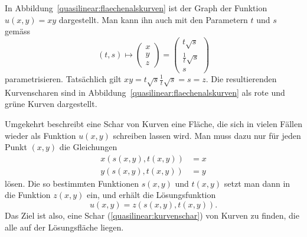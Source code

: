 In Abbildung~\ref{quasilinear:flaechenalskurven} ist der Graph der
Funktion $u(x,y)=xy$ dargestellt.
Man kann ihn auch mit den Parametern $t$ und $s$ gemäss
\begin{equation}
(t,s)
\mapsto
\begin{pmatrix}x\\y\\z\end{pmatrix}
=
\begin{pmatrix}t\sqrt{s}\\\frac1t\sqrt{s}\\s\end{pmatrix}
\label{quasliniear:flaechebeispiel}
\end{equation}
parametrisieren.
Tatsächlich gilt $xy = t\sqrt{s}\frac1t\sqrt{s}=s=z$.
Die resultierenden Kurvenscharen sind in
Abbildung~\ref{quasilinear:flaechenalskurven} als rote und grüne Kurven
dargestellt.

Umgekehrt beschreibt eine Schar von Kurven eine Fläche, die sich
in vielen Fällen wieder als Funktion $u(x,y)$ schreiben lassen wird.
Man muss dazu nur für jeden Punkt $(x,y)$ die Gleichungen
\begin{align*}
x(s(x,y),t(x,y))&=x\\
y(s(x,y),t(x,y))&=y
\end{align*}
lösen.
Die so bestimmten Funktionen $s(x,y)$ und $t(x,y)$ setzt man dann in
die Funktion $z(x,y)$ ein, und erhält die
Lösungsfunktion
\[
u(x,y)=z(s(x,y), t(x,y)).
\]
Das Ziel ist also, eine Schar (\ref{quasilinear:kurvenschar})
von Kurven zu finden, die alle auf der Lösungsfläche liegen.

